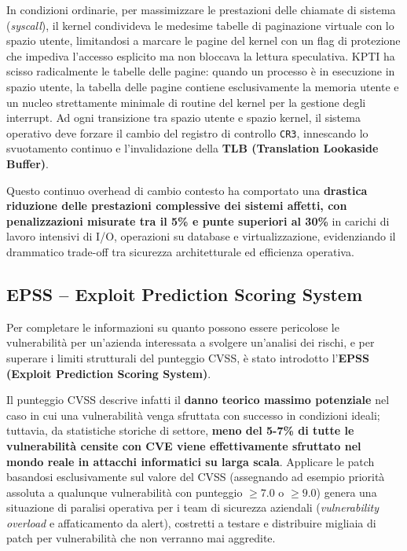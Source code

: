 \documentclass[../../main.tex]{subfiles}
\begin{document}
In condizioni ordinarie, per massimizzare le prestazioni delle chiamate di sistema (\textit{syscall}), il kernel condivideva le medesime tabelle di paginazione virtuale con lo spazio utente, limitandosi a marcare le pagine del kernel con un flag di protezione che impediva l'accesso esplicito ma non bloccava la lettura speculativa. KPTI ha scisso radicalmente le tabelle delle pagine: quando un processo è in esecuzione in spazio utente, la tabella delle pagine contiene esclusivamente la memoria utente e un nucleo strettamente minimale di routine del kernel per la gestione degli interrupt. Ad ogni transizione tra spazio utente e spazio kernel, il sistema operativo deve forzare il cambio del registro di controllo \texttt{CR3}, innescando lo svuotamento continuo e l'invalidazione della \textbf{TLB (Translation Lookaside Buffer)}.

Questo continuo overhead di cambio contesto ha comportato una \textbf{drastica riduzione delle prestazioni complessive dei sistemi affetti, con penalizzazioni misurate tra il 5\% e punte superiori al 30\%} in carichi di lavoro intensivi di I/O, operazioni su database e virtualizzazione, evidenziando il drammatico trade-off tra sicurezza architetturale ed efficienza operativa.

\subsection{EPSS -- Exploit Prediction Scoring System}
\label{subsec:epss}

Per completare le informazioni su quanto possono essere pericolose le vulnerabilità per un'azienda interessata a svolgere un'analisi dei rischi, e per superare i limiti strutturali del punteggio CVSS, è stato introdotto l'\textbf{EPSS (Exploit Prediction Scoring System)}.

Il punteggio CVSS descrive infatti il \textbf{danno teorico massimo potenziale} nel caso in cui una vulnerabilità venga sfruttata con successo in condizioni ideali; tuttavia, da statistiche storiche di settore, \textbf{meno del 5-7\% di tutte le vulnerabilità censite con CVE viene effettivamente sfruttato nel mondo reale in attacchi informatici su larga scala}. Applicare le patch basandosi esclusivamente sul valore del CVSS (assegnando ad esempio priorità assoluta a qualunque vulnerabilità con punteggio $\ge 7.0$ o $\ge 9.0$) genera una situazione di paralisi operativa per i team di sicurezza aziendali (\textit{vulnerability overload} e affaticamento da alert), costretti a testare e distribuire migliaia di patch per vulnerabilità che non verranno mai aggredite.
\end{document}
